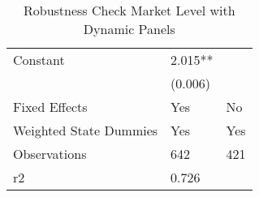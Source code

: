 \begin{table}[]
\begin{tabular}{@{}lll@{}}
Constant                   & 2.015**                 &                         \\
                           & (0.006)                 &                         \\
Fixed Effects              & Yes                     & No                      \\
Weighted State Dummies     & Yes                     & Yes                     \\
Observations               & 642                     & 421                     \\
r2                         & 0.726                   &                         \\ \bottomrule
\end{tabular}
\caption{Robustness Check Market Level with Dynamic Panels}
\label{rob_mkt_dynamic}
\end{table}